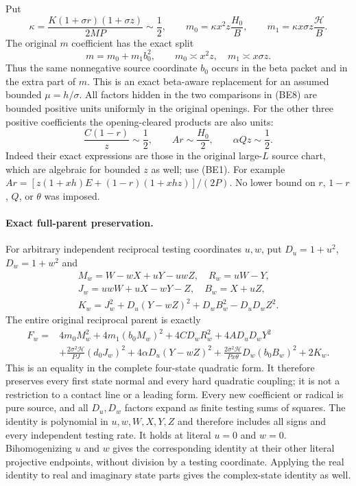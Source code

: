 Put
\[
 \kappa=\frac{K(1+\sigma r)(1+\sigma z)}{2MP}\sim\frac12,
 \qquad m_0=\kappa x^2z\frac{H_0}{B},\qquad
 m_1=\kappa x\sigma z\frac{\mathcal H}{B}.
\]
The original $m$ coefficient has the exact split
\[
 m=m_0+m_1b_0^2,\qquad
 m_0\asymp x^2z,\quad m_1\asymp x\sigma z.
 \tag{BE8}
\]
Thus the same nonnegative source coordinate $b_0$ occurs in the beta
packet and in the extra part of $m$. This is an exact beta-aware
replacement for an assumed bounded $\mu=h/\sigma$.
All factors hidden in the two comparisons in (BE8) are bounded positive
units uniformly in the original openings.
For the other three positive coefficients the opening-cleared products
are also units:
\[
 \frac{C(1-r)}z\sim\frac12,\qquad Ar\sim\frac{H_0}{2},
 \qquad \alpha Qz\sim\frac12.
 \tag{BE9}
\]
Indeed their exact expressions are those in the original large-$L$
source chart, which are algebraic for bounded $z$ as well; use (BE1).
For example $Ar=[z(1+xh)E+(1-r)(1+xhz)]/(2P)$.
No lower bound on $r$, $1-r$, $Q$, or $\theta$ was imposed.

\paragraph{Exact full-parent preservation.}
For arbitrary independent reciprocal testing coordinates $u,w$, put
$D_u=1+u^2$, $D_w=1+w^2$ and
\begin{gather*}
 M_w=W-wX+uY-uwZ,\quad R_w=uW-Y,\\
 J_w=uwW+uX-wY-Z,\quad B_w=X+uZ,\\
 K_w=J_w^2+D_u(Y-wZ)^2+D_wB_w^2-D_uD_wZ^2.
\end{gather*}
The entire original reciprocal parent is exactly
\begin{align*}
 F_w={}&4m_0M_w^2+4m_1(b_0M_w)^2
       +4CD_wR_w^2+4AD_uD_wY^2\\
 &+\frac{2\sigma^2\mathcal H}{PJ}(d_0J_w)^2
       +4\alpha D_u(Y-wZ)^2
       +\frac{2\sigma^2\mathcal H}{Px\theta}D_w(b_0B_w)^2
       +2K_w.                                      \tag{BE10}
\end{align*}
This is an equality in the complete four-state quadratic form.
It therefore preserves every first state normal and every hard
quadratic coupling; it is not a restriction to a contact line or a
leading form. Every new coefficient or radical is pure source, and all
$D_u,D_w$ factors expand as finite testing sums of squares.
The identity is polynomial in $u,w,W,X,Y,Z$ and therefore includes all
signs and every independent testing rate. It holds at literal $u=0$
and $w=0$. Bihomogenizing $u$ and $w$ gives the corresponding identity
at their other literal projective endpoints, without division by a
testing coordinate. Applying the real identity to real and imaginary
state parts gives the complex-state identity as well.

